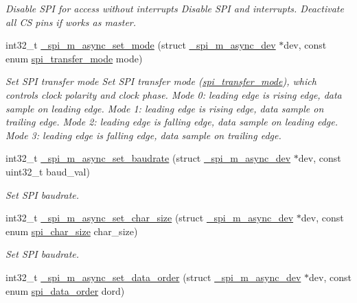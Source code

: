 \begin{DoxyCompactItemize}
\begin{DoxyCompactList}\small\item\em Disable S\+PI for access without interrupts Disable S\+PI and interrupts. Deactivate all CS pins if works as master. \end{DoxyCompactList}\item 
int32\+\_\+t \hyperlink{group__hpl__spi_ga2044d42ba5353a59324da48cebf69e25}{\+\_\+spi\+\_\+m\+\_\+async\+\_\+set\+\_\+mode} (struct \hyperlink{group__hpl__spi_gaab37ebaab3686617eb20d5d175e82e6a}{\+\_\+spi\+\_\+m\+\_\+async\+\_\+dev} $\ast$dev, const enum \hyperlink{group__hpl__spi_ga9c30fdfffba6be76b4044ccb17b218e5}{spi\+\_\+transfer\+\_\+mode} mode)
\begin{DoxyCompactList}\small\item\em Set S\+PI transfer mode Set S\+PI transfer mode (\hyperlink{group__hpl__spi_ga9c30fdfffba6be76b4044ccb17b218e5}{spi\+\_\+transfer\+\_\+mode}), which controls clock polarity and clock phase. Mode 0\+: leading edge is rising edge, data sample on leading edge. Mode 1\+: leading edge is rising edge, data sample on trailing edge. Mode 2\+: leading edge is falling edge, data sample on leading edge. Mode 3\+: leading edge is falling edge, data sample on trailing edge. \end{DoxyCompactList}\item 
int32\+\_\+t \hyperlink{group__hpl__spi_gac3b42aecc24e3edf0b9d608db13056d2}{\+\_\+spi\+\_\+m\+\_\+async\+\_\+set\+\_\+baudrate} (struct \hyperlink{group__hpl__spi_gaab37ebaab3686617eb20d5d175e82e6a}{\+\_\+spi\+\_\+m\+\_\+async\+\_\+dev} $\ast$dev, const uint32\+\_\+t baud\+\_\+val)
\begin{DoxyCompactList}\small\item\em Set S\+PI baudrate. \end{DoxyCompactList}\item 
int32\+\_\+t \hyperlink{group__hpl__spi_gaaed0c114955cb90a53932deadd347895}{\+\_\+spi\+\_\+m\+\_\+async\+\_\+set\+\_\+char\+\_\+size} (struct \hyperlink{group__hpl__spi_gaab37ebaab3686617eb20d5d175e82e6a}{\+\_\+spi\+\_\+m\+\_\+async\+\_\+dev} $\ast$dev, const enum \hyperlink{group__hpl__spi_ga4a3ef460c2cea333834811806f32d60a}{spi\+\_\+char\+\_\+size} char\+\_\+size)
\begin{DoxyCompactList}\small\item\em Set S\+PI baudrate. \end{DoxyCompactList}\item 
int32\+\_\+t \hyperlink{group__hpl__spi_gaa8228094fcecc7b1f75b2f3f6e1a63a0}{\+\_\+spi\+\_\+m\+\_\+async\+\_\+set\+\_\+data\+\_\+order} (struct \hyperlink{group__hpl__spi_gaab37ebaab3686617eb20d5d175e82e6a}{\+\_\+spi\+\_\+m\+\_\+async\+\_\+dev} $\ast$dev, const enum \hyperlink{group__hpl__spi_gabaa69dbc0601cb5b1e2681400598a4b2}{spi\+\_\+data\+\_\+order} dord)

\end{DoxyCompactItemize}
